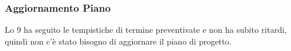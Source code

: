 \subsubsection{Aggiornamento Piano}
\label{sec:aggiornamento_piano_sprint9}
Lo  9 ha seguito le tempistiche di termine preventivate e non ha subito ritardi, quindi non c'è stato bisogno di aggiornare il piano di progetto.